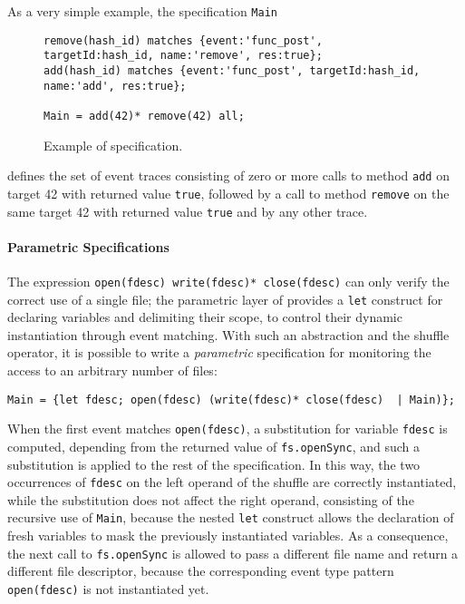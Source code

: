 As a very simple example, the specification \lstinline{Main} 
\begin{figure}[h]
\begin{lstlisting}[basicstyle=\ttfamily\footnotesize]
remove(hash_id) matches {event:'func_post', targetId:hash_id, name:'remove', res:true};
add(hash_id) matches {event:'func_post', targetId:hash_id, name:'add', res:true};

Main = add(42)* remove(42) all;
\end{lstlisting}
\caption{Example of specification.}\label{list:example}
\end{figure}
defines the set of event traces consisting of zero or more calls to method \lstinline{add} on target 42 with returned value \lstinline{true},
followed by a call to method \lstinline{remove} on the same target 42 with returned value \lstinline{true} and by any other trace.

\paragraph{Parametric Specifications}
The expression \lstinline{open(fdesc) write(fdesc)* close(fdesc)} can only verify the correct use of a single file;
the parametric layer of \rml provides a \lstinline{let} construct \cite{AnconaFM17} for declaring variables and delimiting their scope,
to control their dynamic instantiation through event matching.
With such an abstraction and the shuffle operator, it is possible to write a \emph{parametric} specification
for monitoring the access to an arbitrary number of files:
\begin{lstlisting}[basicstyle=\ttfamily\footnotesize]
Main = {let fdesc; open(fdesc) (write(fdesc)* close(fdesc)  | Main)};
\end{lstlisting}
When the first event matches \lstinline{open(fdesc)}, a substitution for variable 
\lstinline{fdesc} is computed, depending from the returned value of \lstinline{fs.openSync}, and such a substitution is applied
to the rest of the specification.
In this way, the two occurrences of \lstinline{fdesc} on the left operand of the shuffle are correctly
instantiated, while the substitution does not affect the right operand, consisting of the recursive
use of \lstinline{Main}, because the nested \lstinline{let} construct allows the declaration of fresh
variables to mask the previously instantiated variables. As a consequence, the
next call to \lstinline{fs.openSync} is allowed to pass a different file name and return a
different file descriptor, because the corresponding event type pattern \lstinline{open(fdesc)}
is not instantiated yet.

